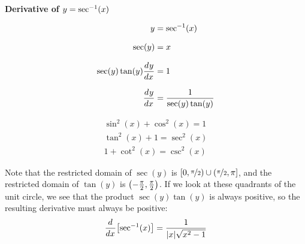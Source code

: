 \documentclass[answers]{exam}
\begin{document}
\noindent
{}

\noindent
\textbf{Derivative of $y=\sec^{-1}(x)$}

\begin{center}
  \begin{minipage}{0.3\linewidth}
    \begin{align*}
      y&=\sec^{-1}(x)\\[7.5pt]
      \sec(y)&=x\\[7.5pt]
      \sec(y)\tan(y){\frac{d^{}y}{dx^{}}}&=1\\[7.5pt]
      {\frac{d^{}y}{dx^{}}}&=\frac{1}{\sec(y)\tan(y)}
    \end{align*}
  \end{minipage}%
  \hspace*{0.15\linewidth}
  \begin{minipage}{0.3\linewidth}
    
    \vspace*{-15pt}
    \begin{align*}
      \sin^2(x)+\cos^2(x)=1\\[7.5pt]
      \tan^2(x)+1=\sec^2(x)\\[7.5pt]
      1+\cot^2(x)=\csc^2(x)
    \end{align*}
  \end{minipage}%
\end{center}
Note that the restricted domain of $\sec(y)$ is $[0,\nicefrac{\pi}{2})\cup(\nicefrac{\pi}{2},\pi]$, and the restricted domain of $\tan(y)$ is ${\left(-\frac{\pi}{2},\frac{\pi}{2}\right)}$. If we look at these quadrants of the unit circle, we see that the product $\sec(y)\tan(y)$ is always positive, so the resulting derivative must always be positive:
  \[{\frac{d^{}}{dx^{}}}{\left[\sec^{-1}(x)\right]}=\frac{1}{{\left\vert x\right\vert}\sqrt{x^2-1}}\]
\pagebreak
\end{document}
